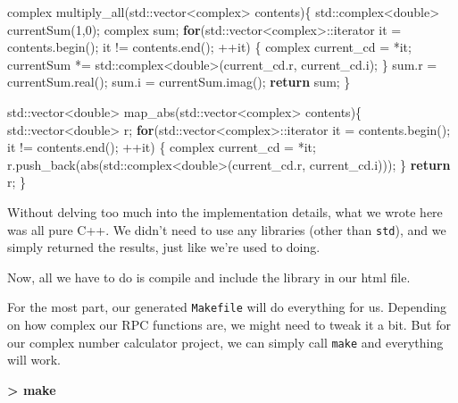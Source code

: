 \documentclass[]{article}
\newenvironment{Shaded}{}{}
\newcommand{\KeywordTok}[1]{\textcolor[rgb]{0.00,0.44,0.13}{\textbf{{#1}}}}
\newcommand{\DataTypeTok}[1]{\textcolor[rgb]{0.56,0.13,0.00}{{#1}}}
\newcommand{\DecValTok}[1]{\textcolor[rgb]{0.25,0.63,0.44}{{#1}}}
\newcommand{\NormalTok}[1]{{#1}}
\begin{document}
\begin{Shaded}
\begin{Highlighting}[]
\NormalTok{complex multiply_all(std::vector<complex> contents)\{}
    \NormalTok{std::complex<}\DataTypeTok{double}\NormalTok{> currentSum(}\DecValTok{1}\NormalTok{,}\DecValTok{0}\NormalTok{);}
    \NormalTok{complex sum;}
    \KeywordTok{for}\NormalTok{(std::vector<complex>::iterator it = contents.begin(); it != contents.end(); ++it) \{}
        \NormalTok{complex current_cd = *it;}
        \NormalTok{currentSum *= std::complex<}\DataTypeTok{double}\NormalTok{>(current_cd.r, current_cd.i);}
    \NormalTok{\}}
    \NormalTok{sum.r = currentSum.real();}
    \NormalTok{sum.i = currentSum.imag();}
    \KeywordTok{return} \NormalTok{sum;}
\NormalTok{\}}


\NormalTok{std::vector<}\DataTypeTok{double}\NormalTok{> map_abs(std::vector<complex> contents)\{}
    \NormalTok{std::vector<}\DataTypeTok{double}\NormalTok{> r;}
    \KeywordTok{for}\NormalTok{(std::vector<complex>::iterator it = contents.begin(); it != contents.end(); ++it) \{}
        \NormalTok{complex current_cd = *it;}
        \NormalTok{r.push_back(abs(std::complex<}\DataTypeTok{double}\NormalTok{>(current_cd.r, current_cd.i)));}
    \NormalTok{\}}
    \KeywordTok{return} \NormalTok{r;}
\NormalTok{\}}
\end{Highlighting}
\end{Shaded}

Without delving too much into the implementation details, what we wrote
here was all pure C++. We didn't need to use any libraries (other than
\texttt{std}), and we simply returned the results, just like we're used
to doing.

Now, all we have to do is compile and include the library in our html
file.


For the most part, our generated \texttt{Makefile} will do everything
for us. Depending on how complex our RPC functions are, we might need to
tweak it a bit. But for our complex number calculator project, we can
simply call \texttt{make} and everything will work.

\begin{Shaded}
\begin{Highlighting}[]
\KeywordTok{> make}
\end{Highlighting}
\end{Shaded}
\end{document}
